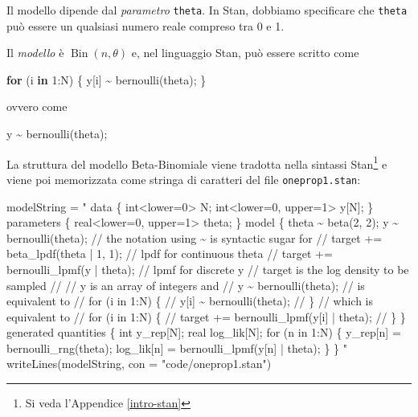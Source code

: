 \documentclass[
  10pt,
  italian,
  a4paper,
  extrafontsizes,onecolumn,openright
  ]{memoir}
\newenvironment{Shaded}{}{}
\newcommand{\AttributeTok}[1]{\textcolor[rgb]{0.49,0.56,0.16}{#1}}
\newcommand{\ControlFlowTok}[1]{\textcolor[rgb]{0.00,0.44,0.13}{\textbf{#1}}}
\newcommand{\DecValTok}[1]{\textcolor[rgb]{0.25,0.63,0.44}{#1}}
\newcommand{\FunctionTok}[1]{\textcolor[rgb]{0.02,0.16,0.49}{#1}}
\newcommand{\NormalTok}[1]{#1}
\newcommand{\OtherTok}[1]{\textcolor[rgb]{0.00,0.44,0.13}{#1}}
\newcommand{\SpecialCharTok}[1]{\textcolor[rgb]{0.25,0.44,0.63}{#1}}
\newcommand{\StringTok}[1]{\textcolor[rgb]{0.25,0.44,0.63}{#1}}
\DeclareMathOperator{\Bin}{Bin} %
\begin{document}
Il modello dipende dal \emph{parametro} \texttt{theta}. In Stan, dobbiamo specificare che \texttt{theta} può essere un qualsiasi numero reale compreso tra 0 e 1.

Il \emph{modello} è \(\Bin(n, \theta)\) e, nel linguaggio Stan, può essere scritto come

\begin{Shaded}
\begin{Highlighting}[]
\ControlFlowTok{for}\NormalTok{ (i }\ControlFlowTok{in} \DecValTok{1}\SpecialCharTok{:}\NormalTok{N) \{}
\NormalTok{  y[i] }\SpecialCharTok{\textasciitilde{}} \FunctionTok{bernoulli}\NormalTok{(theta);}
\NormalTok{\}}
\end{Highlighting}
\end{Shaded}

\noindent
ovvero come

\begin{Shaded}
\begin{Highlighting}[]
\NormalTok{y }\SpecialCharTok{\textasciitilde{}} \FunctionTok{bernoulli}\NormalTok{(theta);}
\end{Highlighting}
\end{Shaded}

La struttura del modello Beta-Binomiale viene tradotta nella sintassi Stan\footnote{Si veda l'Appendice \ref{intro-stan}} e viene poi memorizzata come stringa di caratteri del file \texttt{oneprop1.stan}:

\begin{Shaded}
\begin{Highlighting}[]
\NormalTok{modelString }\OtherTok{=} \StringTok{"}
\StringTok{data \{}
\StringTok{  int\textless{}lower=0\textgreater{} N;}
\StringTok{  int\textless{}lower=0, upper=1\textgreater{} y[N];}
\StringTok{\}}
\StringTok{parameters \{}
\StringTok{  real\textless{}lower=0, upper=1\textgreater{} theta;}
\StringTok{\}}
\StringTok{model \{}
\StringTok{  theta \textasciitilde{} beta(2, 2);}
\StringTok{  y \textasciitilde{} bernoulli(theta);}
\StringTok{  // the notation using \textasciitilde{} is syntactic sugar for}
\StringTok{  //  target += beta\_lpdf(theta | 1, 1);   // lpdf for continuous theta}
\StringTok{  //  target += bernoulli\_lpmf(y | theta); // lpmf for discrete y}
\StringTok{  // target is the log density to be sampled}
\StringTok{  //}
\StringTok{  // y is an array of integers and}
\StringTok{  //  y \textasciitilde{} bernoulli(theta);}
\StringTok{  // is equivalent to}
\StringTok{  //  for (i in 1:N) \{}
\StringTok{  //    y[i] \textasciitilde{} bernoulli(theta);}
\StringTok{  //  \}}
\StringTok{  // which is equivalent to}
\StringTok{  //  for (i in 1:N) \{}
\StringTok{  //    target += bernoulli\_lpmf(y[i] | theta); }
\StringTok{  //  \}}
\StringTok{\}}
\StringTok{generated quantities \{}
\StringTok{  int y\_rep[N];}
\StringTok{  real log\_lik[N];}
\StringTok{  for (n in 1:N) \{}
\StringTok{    y\_rep[n] = bernoulli\_rng(theta);}
\StringTok{    log\_lik[n] = bernoulli\_lpmf(y[n] | theta);}
\StringTok{  \}}
\StringTok{\}}
\StringTok{"}
\FunctionTok{writeLines}\NormalTok{(modelString, }\AttributeTok{con =} \StringTok{"code/oneprop1.stan"}\NormalTok{)}
\end{Highlighting}
\end{Shaded}
\end{document}
